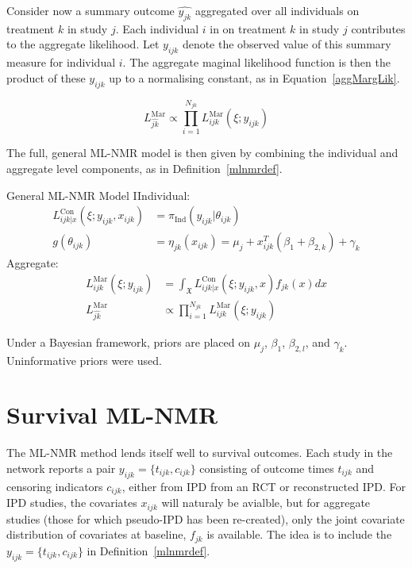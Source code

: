 Consider now a summary outcome $\hat{y_{jk}}$ aggregated over all individuals on treatment $k$ in study $j$. Each individual $i$ in on treatment $k$ in study $j$ contributes to the aggregate likelihood. Let $y_{ijk}$ denote the observed value of this summary measure for individual $i$. The aggregate maginal likelihood function is then the product of these $y_{ijk}$ up to a normalising constant, as in Equation~\ref{aggMargLik}.

\begin{equation}
    L_{\hat{jk}}^{\text{Mar}} \propto \prod_{i = 1}^{N_{jk}}L_{ijk}^{\text{Mar}}(\xi; y_{ijk})
    \label{aggMargLik}
\end{equation}

The full, general ML-NMR model is then given by combining the individual and aggregate level components, as in Definition~\ref{mlnmrdef}.

\begin{definition}[label=mlnmrdef]{General ML-NMR Model}
    IIndividual:
    \begin{align}
        L_{ijk|x}^{\text{Con}}(\xi;y_{ijk},x_{ijk}) &= \pi_{\text{Ind}}(y_{ijk}|\theta_{ijk}) \\
        g(\theta_{ijk}) &= \eta_{jk}(x_{ijk}) = \mu_j + x_{ijk}^T(\beta_1 + \beta_{2,k}) + \gamma_k \label{mlnmragg}
    \end{align}
    Aggregate:
    \begin{align}
        L_{ijk}^{\text{Mar}}(\xi; y_{ijk}) &= \int_{\mathfrak{X}} L_{ijk|x}^{\text{Con}}(\xi; y_{ijk}, x)f_{jk}(x)dx \label{mlnnmrint}\\
        L_{\hat{jk}}^{\text{Mar}} &\propto \prod_{i = 1}^{N_{jk}}L_{ijk}^{\text{Mar}}(\xi; y_{ijk})
    \end{align}
\end{definition}

Under a Bayesian framework, priors are placed on $\mu_j$, $\beta_1$, $\beta_{2,l}$, and $\gamma_k$. Uninformative priors were used.

\section{Survival ML-NMR}
The ML-NMR method lends itself well to survival outcomes. Each study in the network reports a pair $y_{ijk} = \{t_{ijk}, c_{ijk}\}$ consisting of outcome times $t_{ijk}$ and censoring indicators $c_{ijk}$, either from IPD from an RCT or reconstructed IPD. For IPD studies, the covariates $x_{ijk}$ will naturaly be avialble, but for aggregate studies (those for which pseudo-IPD has been re-created), only the joint covariate distribution of covariates at baseline, $f_{jk}$ is available. The idea is to include the $y_{ijk} = \{t_{ijk}, c_{ijk}\}$ in Definition~\ref{mlnmrdef}. \\

